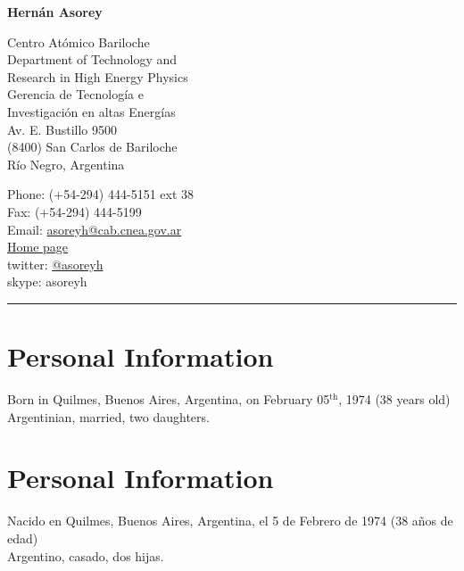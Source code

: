 \begin{center}{\huge \bf Hernán Asorey}\\[1cm]\end{center}
\begin{minipage}[t]{0.495\textwidth}
  Centro Atómico Bariloche\\
\ifeng
  Department of Technology and\\
  Research in High Energy Physics\\
\else
  Gerencia de Tecnología e \\
  Investigación en altas Energías\\
\fi
  Av. E. Bustillo 9500\\
  (8400) San Carlos de Bariloche\\
  Río Negro, Argentina\\[.2cm]
\end{minipage}
\begin{minipage}[t]{0.495\textwidth}
  Phone: (+54-294) 444-5151 ext 38\\
  Fax: (+54-294) 444-5199\\
  Email: \href{mailto:asoreyh@cab.cnea.gov.ar}{asoreyh@cab.cnea.gov.ar}\\
  \href{http://fisica.cab.cnea.gov.ar/particulas/wiki/User:Asoreyh}{Home page}\\
  twitter: \href{https://twitter.com/#!/asoreyh}{@asoreyh}\\
  skype: asoreyh\\
\end{minipage}
\hrule
\ifeng
\section*{Personal Information}
Born in Quilmes, Buenos Aires, Argentina, on February 05$^\mathrm{th}$, 1974 (38 years old)\\
Argentinian, married, two daughters.
\else
\section*{Personal Information}
Nacido en Quilmes, Buenos Aires, Argentina, el 5 de Febrero de 1974 (38 años de edad)\\
Argentino, casado, dos hijas.
\fi
